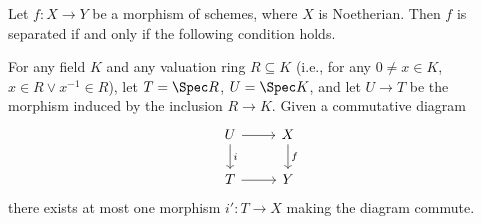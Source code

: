 Let $f\colon X\to Y$ be a morphism of schemes, where $X$ is Noetherian. Then
$f$ is separated if and only if the following condition holds.

For any field $K$ and any valuation ring $R \subseteq K$ (i.e., for any $0\neq x \in K$,
$x \in R\vee x^{-1} \in R$), let $T = \Spec R$, $U = \Spec K$, and let $U\to T$
be the morphism induced by the inclusion $R\to K$.
Given a commutative diagram
\[\begin{tikzcd}
	U\ar[r]\ar[d, "i"] & X\ar[d, "f"]\\
	T\ar[r] & Y
\end{tikzcd}\]
there exists at most one morphism $i'\colon T\to X$ making the diagram commute.

